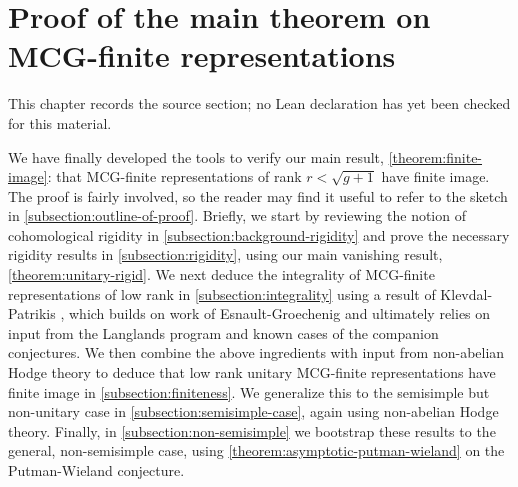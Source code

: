 \chapter{Proof of the main theorem on MCG-finite representations}
\label{canonical-representations-surface-groups-chapter-08}

\begin{remark}
\label{canonical-representations-surface-groups-chapter-08-source}
This chapter records the source section; no Lean declaration has yet been checked for this material.
\notready
\end{remark}

\label{section:main-proof}

We have finally developed the tools to verify our main result, \autoref{theorem:finite-image}: that  MCG-finite representations of rank $r<\sqrt{g+1}$ have finite image.
The proof is fairly involved, so the reader may find it useful to refer to the sketch in \autoref{subsection:outline-of-proof}. Briefly, we
start by reviewing the notion of cohomological rigidity in
\autoref{subsection:background-rigidity}
and prove the necessary rigidity results in
\autoref{subsection:rigidity}, using our main vanishing result,
\autoref{theorem:unitary-rigid}.
We next deduce the integrality of MCG-finite representations of low rank in
\autoref{subsection:integrality}
using a result of
Klevdal-Patrikis \cite{klevdalP:g-rigid-local-systems-are-integral}, which builds on work of Esnault-Groechenig \cite{esnault2018cohomologically} and ultimately relies on input from the Langlands program and known cases of the companion conjectures.
We then combine the above ingredients with input from non-abelian Hodge theory to deduce that low rank unitary MCG-finite representations
have finite image in \autoref{subsection:finiteness}.
We generalize this to the semisimple but non-unitary case in
\autoref{subsection:semisimple-case}, again using non-abelian Hodge theory.
Finally, in \autoref{subsection:non-semisimple} we bootstrap these results to the general, non-semisimple case,
using \autoref{theorem:asymptotic-putman-wieland} on the Putman-Wieland conjecture.


